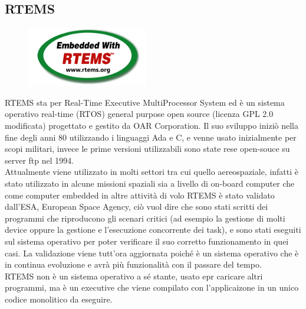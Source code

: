 \documentclass[12pt, a4paper, titlepage, oneside]{book}
\begin{document}
\begin{flushleft}
\section{RTEMS}
\begin{figure}[h]
    \centering
    \includegraphics[scale = 2]{rtemslogo.png}
\end{figure}
RTEMS sta per Real-Time Executive MultiProcessor System ed è un sistema operativo real-time (RTOS) general purpose open source (licenza GPL 2.0 modificata) progettato e gestito da OAR Corporation. Il suo sviluppo iniziò nella fine degli anni 80 utilizzando i linguaggi Ada e C, e venne usato inizialmente per scopi militari, invece le prime versioni utilizzabili sono state rese open-souce su server ftp nel 1994.\\
Attualmente viene utilizzato in molti settori tra cui quello aereospaziale, infatti è stato utilizzato in alcune missioni spaziali sia a livello di on-board computer che come computer embedded in altre attività di volo
RTEMS è  stato validato dall'ESA, European Space Agency, ciò vuol dire che sono stati scritti dei programmi che riproducono gli scenari critici (ad esempio la gestione di molti device oppure la gestione e l'esecuzione concorrente dei task), e sono stati eseguiti sul sistema operativo per poter verificare il suo corretto funzionamento in quei casi. La validazione viene tutt'ora aggiornata poiché è un sistema operativo che è in continua evoluzione e avrà più funzionalità con il passare del tempo.\\
RTEMS non è un sistema operativo a sé stante, usato epr caricare altri programmi, ma è un executive che viene compilato con l'applicaizone in un unico codice monolitico da eseguire.

\end{flushleft}
\end{document}
